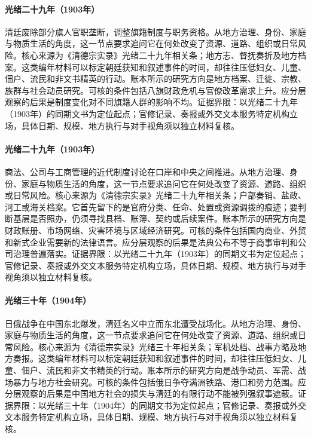 \hypertarget{social:EQ-1903-BANNER-POSTS-REFORM}{}\paragraph{光绪二十九年（1903年）}清廷废除部分旗人官职垄断，调整旗籍制度与职务资格。从地方治理、身份、家庭与物质生活的角度，这一节点要求追问它在何处改变了资源、道路、组织或日常风险。核心来源为《清德宗实录》光绪二十九年相关条；地方志、督抚奏折及地方档案。这类编年材料可以标定朝廷获知和叙述事件的时间，却往往压低妇女、儿童、佃户、流民和非文书精英的行动。账本所示的研究方向是地方档案、迁徙、宗教、族群与社会动员研究。可核的条件包括八旗财政危机与官僚改革需求上升。应分层观察的后果是制度变化对不同旗籍人群的影响不均。证据界限：以光绪二十九年（1903年）的同期文书为定位起点；官修记录、奏报或外交文本服务特定机构立场，具体日期、规模、地方执行与对手视角须以独立材料复核。
\hypertarget{social:EQ-1903-SHANGHAI-COMMERCIAL-LAW}{}\paragraph{光绪二十九年（1903年）}商法、公司与工商管理的近代制度讨论在口岸和中央之间推进。从地方治理、身份、家庭与物质生活的角度，这一节点要求追问它在何处改变了资源、道路、组织或日常风险。核心来源为《清德宗实录》光绪二十九年相关条；户部奏销、盐政、河工或海关档案。它首先留下的是官府分类、任命、处置或资源调拨的痕迹；要判断基层是否照办，仍须寻找县档、账簿、契约或后续案件。账本所示的研究方向是财政账册、市场网络、灾害环境与区域经济研究。可核的条件包括国内商业、外贸和新式企业需要新的法律语言。应分层观察的后果是法典公布不等于商事审判和公司治理普遍落实。证据界限：以光绪二十九年（1903年）的同期文书为定位起点；官修记录、奏报或外交文本服务特定机构立场，具体日期、规模、地方执行与对手视角须以独立材料复核。
\hypertarget{social:EQ-1904-RUSSO-JAPANESE-WAR}{}\paragraph{光绪三十年（1904年）}日俄战争在中国东北爆发，清廷名义中立而东北遭受战场化。从地方治理、身份、家庭与物质生活的角度，这一节点要求追问它在何处改变了资源、道路、组织或日常风险。核心来源为《清德宗实录》光绪三十年相关条；军机处档、战事方略及地方奏报。这类编年材料可以标定朝廷获知和叙述事件的时间，却往往压低妇女、儿童、佃户、流民和非文书精英的行动。账本所示的研究方向是战争动员、军需、战场暴力与地方社会研究。可核的条件包括俄日争夺满洲铁路、港口和势力范围。应分层观察的后果是中国地方社会的损失与清廷的有限行动不能被列强叙事遮蔽。证据界限：以光绪三十年（1904年）的同期文书为定位起点；官修记录、奏报或外交文本服务特定机构立场，具体日期、规模、地方执行与对手视角须以独立材料复核。
